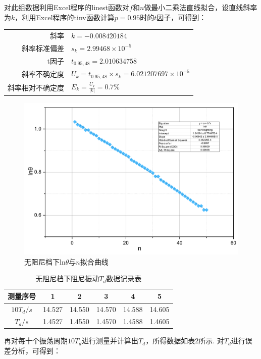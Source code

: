 \documentclass[UTF8]{ctexart}
\begin{document}
对此组数据利用Excel程序的linest函数对$f$和$n$做最小二乘法直线拟合，设直线斜率为$k$，利用Excel程序的tinv函数计算$p = 0.95$时的$t$因子，可得到：\par
\begin{center}\begin{tabular}{r l}
{斜率}& {$k=-0.008420184$}\\
{斜率标准偏差}& {$s_k=2.99468\times 10^{-5}$}\\
{t因子}& {$t_{0.95,48}=2.010634758$}\\
{斜率不确定度}& {$U_k=t_{0.95,48}\times s_k = 6.021207697\times 10^{-5}$}\\
{斜率相对不确定度}& {$E_k=\frac{U_k}{|k|}=0.7\%$}
\end{tabular}\end{center}
\begin{figure}\centering
{
\caption{无阻尼档下ln$\theta$与$n$拟合曲线}
\label{0}
\includegraphics[scale=0.4]{0.pdf}
}
\end{figure}
\begin{table}[H]
{\begin{center}{
\caption{无阻尼档下阻尼振动$T_d$数据记录表}
\begin{tabular}{|c|c|c|c|c|c|}
\hline
测量序号&1&2&3&4&5\\
\hline
$10T_d/s$&14.527&14.550&14.570&14.588&14.605\\
\hline
$T_d/s$&1.4527&1.4550&1.4570&1.4588&1.4605\\
\hline
\end{tabular}}\end{center}}\end{table}
再对每十个振荡周期$10T_d$进行测量并计算出$T_d$，所得数据如表2所示. 对$T_{d}$进行误差分析，可得到：\par
\end{document}
